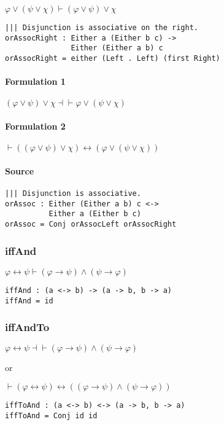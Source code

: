 \documentclass{acm_proc_article-sp}
\renewcommand{\iff}{\leftrightarrow}
\renewcommand{\implies}{\rightarrow}
\begin{document}
\(\varphi \lor (\psi \lor \chi) \vdash (\varphi \lor \psi) \lor \chi\)

\begin{verbatim}
||| Disjunction is associative on the right.
orAssocRight : Either a (Either b c) ->
               Either (Either a b) c
orAssocRight = either (Left . Left) (first Right)
\end{verbatim}

\paragraph{Formulation 1}\label{formulation-1-2}

\((\varphi \lor \psi) \lor \chi \dashv\vdash \varphi \lor (\psi \lor \chi)\)

\paragraph{Formulation 2}\label{formulation-2-2}

\(\vdash ((\varphi \lor \psi) \lor \chi) \iff (\varphi \lor (\psi \lor \chi))\)

\paragraph{Source}\label{source-2}

\begin{verbatim}
||| Disjunction is associative.
orAssoc : Either (Either a b) c <->
          Either a (Either b c)
orAssoc = Conj orAssocLeft orAssocRight
\end{verbatim}

\newpage

\subsubsection{iffAnd}\label{iffand}

\(\varphi \iff \psi \vdash (\varphi \implies \psi) \land (\psi \implies \varphi)\)

\begin{verbatim}
iffAnd : (a <-> b) -> (a -> b, b -> a)
iffAnd = id
\end{verbatim}

\subsubsection{iffAndTo}\label{iffandto}

\(\varphi \iff \psi \dashv\vdash (\varphi \implies \psi) \land (\psi \implies \varphi)\)

or

\(\vdash (\varphi \iff \psi) \iff ((\varphi \implies \psi) \land (\psi \implies \varphi))\)

\begin{verbatim}
iffToAnd : (a <-> b) <-> (a -> b, b -> a)
iffToAnd = Conj id id
\end{verbatim}

\balancecolumns
\end{document}
